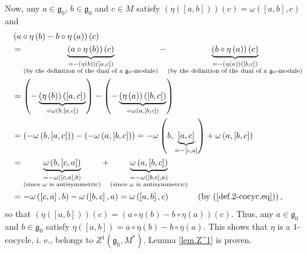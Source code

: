 \documentclass
[numbers=enddot,12pt,final,onecolumn,german,notitlepage]{scrartcl}%
\theoremstyle{definition}
\begin{document}
Now, any $a\in\mathfrak{g}_{0}$, $b\in\mathfrak{g}_{0}$ and $c\in M$ satisfy
$\left(  \eta\left(  \left[  a,b\right]  \right)  \right)  \left(  c\right)
=\omega\left(  \left[  a,b\right]  ,c\right)  $ and%
\begin{align*}
&  \left(  a\circ\eta\left(  b\right)  -b\circ\eta\left(  a\right)  \right)
\left(  c\right) \\
&  =\underbrace{\left(  a\circ\eta\left(  b\right)  \right)  \left(  c\right)
}_{\substack{=-\left(  \eta\left(  b\right)  \right)  \left(  \left[
a,c\right]  \right)  \\\text{(by the definition of the dual of a }%
\mathfrak{g}_{0}\text{-module)}}}-\underbrace{\left(  b\circ\eta\left(
a\right)  \right)  \left(  c\right)  }_{\substack{=-\left(  \eta\left(
a\right)  \right)  \left(  \left[  b,c\right]  \right)  \\\text{(by the
definition of the dual of a }\mathfrak{g}_{0}\text{-module)}}}\\
&  =\left(  -\underbrace{\left(  \eta\left(  b\right)  \right)  \left(
\left[  a,c\right]  \right)  }_{=\omega\left(  b,\left[  a,c\right]  \right)
}\right)  -\left(  -\underbrace{\left(  \eta\left(  a\right)  \right)  \left(
\left[  b,c\right]  \right)  }_{=\omega\left(  a,\left[  b,c\right]  \right)
}\right) \\
&  =\left(  -\omega\left(  b,\left[  a,c\right]  \right)  \right)  -\left(
-\omega\left(  a,\left[  b,c\right]  \right)  \right)  =-\omega\left(
b,\underbrace{\left[  a,c\right]  }_{=-\left[  c,a\right]  }\right)
+\omega\left(  a,\left[  b,c\right]  \right) \\
&  =\underbrace{\omega\left(  b,\left[  c,a\right]  \right)  }%
_{\substack{=-\omega\left(  \left[  c,a\right]  ,b\right)  \\\text{(since
}\omega\text{ is antisymmetric)}}}+\underbrace{\omega\left(  a,\left[
b,c\right]  \right)  }_{\substack{=-\omega\left(  \left[  b,c\right]
,a\right)  \\\text{(since }\omega\text{ is antisymmetric)}}}\\
&  =-\omega\left(  \left[  c,a\right]  ,b\right)  -\omega\left(  \left[
b,c\right]  ,a\right)  =\omega\left(  \left[  a,b\right]  ,c\right)
\ \ \ \ \ \ \ \ \ \ \left(  \text{by (\ref{def.2-cocyc.eq})}\right)  ,
\end{align*}
so that $\left(  \eta\left(  \left[  a,b\right]  \right)  \right)  \left(
c\right)  =\left(  a\circ\eta\left(  b\right)  -b\circ\eta\left(  a\right)
\right)  \left(  c\right)  $. Thus, any $a\in\mathfrak{g}_{0}$ and
$b\in\mathfrak{g}_{0}$ satisfy $\eta\left(  \left[  a,b\right]  \right)
=a\circ\eta\left(  b\right)  -b\circ\eta\left(  a\right)  $. This shows that
$\eta$ is a $1$-cocycle, i. e., belongs to $Z^{1}\left(  \mathfrak{g}%
_{0},M^{\ast}\right)  $. Lemma \ref{lem.Z^1} is proven.
\end{document}
